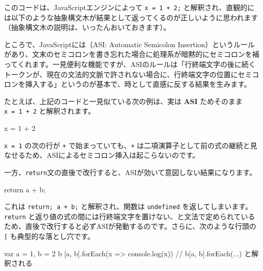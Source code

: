 このコードは、JavaScriptエンジンによって \texttt{x\ =\ 1\ +\ 2;}
と解釈され、直観的には以下のような抽象構文木が結果として返ってくるのが正しいように思われます（抽象構文木の説明は、いったんおいておきます）。

\begin{center}
\end{center}

ところで、JavaScriptには（ASI: Automatic
Semicolon Insertion）というルールがあり、文末のセミコロンを書き忘れた場合に処理系が暗黙的にセミコロンを補ってくれます。一見便利な機能ですが、ASIのルールは「行終端文字の後に続くトークンが、現在の文法的文脈で許されない場合に、行終端文字の位置にセミコロンを挿入する」というのが基本で、時として直感に反する結果を生みます。

たとえば、上記のコードと一見似ている次の例は、実は
\textbf{\sffamily ASI} ためそのまま \texttt{x\ =\ 1\ +\ 2}
と解釈されます。

\begin{codescreen}{}
x = 1
+ 2
\end{codescreen}

\texttt{x\ =\ 1} の次の行が \texttt{+} で始まっていても、\texttt{+}
は二項演算子として前の式の継続と見なせるため、ASIによるセミコロン挿入は起こらないのです。

一方、\texttt{return}文の直後で改行すると、ASIが効いて意図しない結果になります。

\begin{codescreen}{}
return
a + b;
\end{codescreen}

これは \texttt{return;\ a\ +\ b;} と解釈され、関数は \texttt{undefined}
を返してしまいます。\texttt{return}
と返り値の式の間には行終端文字を置けない、と文法で定められているため、直後で改行すると必ずASIが発動するのです。さらに、次のような行頭の
\texttt{[} も典型的な落とし穴です。

\begin{codescreen}{}
var a = 1, b = 2
b
[a, b].forEach(x => console.log(x))  // b[a, b].forEach(...) と解釈される
\end{codescreen}

